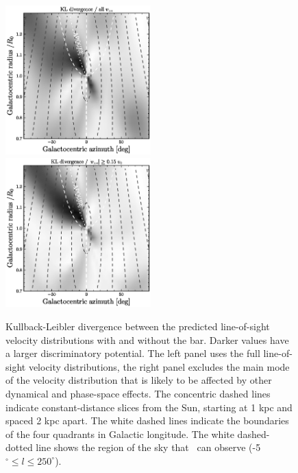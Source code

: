 \clearpage
\begin{figure}
\includegraphics[width=0.5\textwidth]{figs_hercules/detecta.ps}
\includegraphics[width=0.5\textwidth]{figs_hercules/detectb.ps}
\caption[Kullback-Leibler divergence between the predicted
  line-of-sight velocity distributions with and without the
  bar]{Kullback-Leibler divergence between the predicted line-of-sight
  velocity distributions with and without the bar. Darker values have
  a larger discriminatory potential. The left panel uses the full
  line-of-sight velocity distributions, the right panel excludes the
  main mode of the velocity distribution that is likely to be affected
  by other dynamical and phase-space effects. The concentric dashed
  lines indicate constant-distance slices from the Sun, starting at 1
  kpc and spaced 2 kpc apart.  The white dashed lines indicate the
  boundaries of the four quadrants in Galactic longitude.  The white
  dashed-dotted line shows the region of the sky that \apogee\ can
  observe (-5$^{\circ} \leq l \leq 250^{\circ}$).}\label{fig:detect}
\end{figure}

